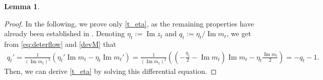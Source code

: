\documentclass[10pt,reqno]{amsart}
\numberwithin{equation}{section}
\numberwithin{figure}{section}
\theoremstyle{plain} %
\newtheorem{lemma}[theorem]{Lemma}
\theoremstyle{definition} %
\newcommand{\pa}[1]{\left({#1}\right)}
\DeclareMathOperator{\im}{\mathrm{Im}}
\numberwithin{equation}{section}
\begin{document}
\begin{lemma}
\begin{itemize}
\end{itemize} 
  
\end{lemma}

\begin{proof}
In the following, we prove only \eqref{t_eta}, as the remaining properties have already been established in \cite[Lemma 4.5]{stone2024randommatrixmodelquantum}. Denoting $\eta_t:=\im z_t$ and $q_t:=\eta_t/\im m_t$, we get from \eqref{eq:deterflow} and \eqref{devM} that
    \begin{equation}\nonumber
        \begin{aligned}
            q_t'=\frac{1}{\pa{\im m_t}^2}\pa{\eta_t'\im m_t-\eta_t \im m_t'}= \frac{1}{\pa{\im m_t}^2}\pa{\pa{-\frac{\eta_t}{2}-\im m_t}\im m_t-\eta_t \frac{\im m_t}{2}}=-q_t-1.
        \end{aligned}
    \end{equation}
    Then, we can derive \eqref{t_eta} by solving this differential equation.
\end{proof}
\end{document}
